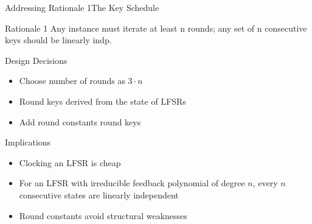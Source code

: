 \begin{frame}{Addressing Rationale 1}{The Key Schedule}
    \vspace{-60pt}
    \begin{minipage}{0.985\textwidth}
    \begin{exampleblock}{Rationale 1}
        Any instance must iterate at least n rounds; any set of n consecutive keys should be linearly indp.
    \end{exampleblock}
    \end{minipage}

    \begin{minipage}[t][85pt][t]{0.47\textwidth}
        \begin{block}{Design Decisions}
            \begin{itemize}
                \item Choose number of rounds as $3 \cdot n$\\[5pt]
                \item Round keys derived from the state of LFSRs\\[5pt]
                \item Add round constants round keys
            \end{itemize}
        \end{block}
    \end{minipage}
    \hfill
    \begin{minipage}[t][85pt][t]{0.47\textwidth}
        \begin{block}{Implications}
            \begin{itemize}
                \item Clocking an LFSR is cheap
                \item For an LFSR with irreducible feedback polynomial of degree $n$, every $n$ consecutive states are linearly independent
                \item Round constants avoid structural weaknesses
            \end{itemize}
        \end{block}
    \end{minipage}
\end{frame}

